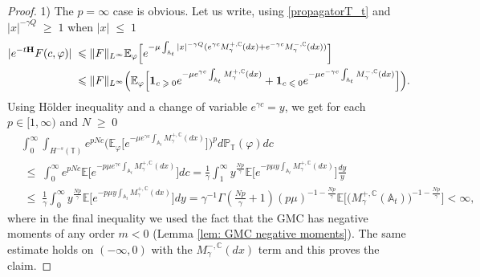 \documentclass[11pt]{amsart}
\numberwithin{equation}{section}
\theoremstyle{definition}
\renewcommand{\leq}{\;\leqslant\;}                   %
\renewcommand{\geq}{\;\geqslant\;}                   %
\newcommand{\C}{\mathbb{C}}
\newcommand{\A}{\mathbb{A}}
\def\P{\mathbb{P}}
\def\E{\mathbb{E}}
\def\T{\mathbb{T}}
\begin{document}
\begin{proof} 1) The $p=\infty$ case is obvious. Let us write, using \eqref{propagatorT_t} and $|x|^{-\gamma Q}\geq 1$ when $|x|\leq 1$
\[ \begin{split}
|e^{-t{\bf H}}F(c,\varphi)|\leq &  \|F\|_{L^\infty} \E_{\varphi}\Big[e^{-\mu\int_{\A_t}|x|^{-\gamma Q}(e^{\gamma c}M_\gamma^{+,\C}(dx)+e^{-\gamma c}M^{-,\C}_\gamma(dx))} \Big]\\
\leq &   \|F\|_{L^\infty} \Big(\E_{\varphi}\Big[{\bf 1}_{c\geq 0}e^{-\mu e^{\gamma c} \int_{\A_t}M_\gamma^{+,\C}(dx)}+{\bf 1}_{c\leq 0}e^{-\mu e^{-\gamma c} \int_{\A_t}M_\gamma^{-,\C}(dx)} \Big]\Big).
\end{split}\]
Using H\"older inequality and a change of variable $e^{\gamma c}=y$, we get  for each $p\in [1,\infty)$ and $N\geq 0$
\begin{align*}
 &\int_0^\infty \int_{H^{-s}(\T)}e^{pN c}\Big(\E_{\varphi}\Big[e^{-\mu e^{\gamma c} \int_{\A_t}M_\gamma^{+,\C}(dx)}\Big]\Big)^pd\P_\T(\varphi)dc\\
& \leq  \int_0^\infty e^{pN c} \E\Big[e^{-p\mu e^{\gamma c} \int_{\A_t}M_\gamma^{+,\C}(dx)}\Big]dc= \frac{1}{\gamma} \int_1^\infty y^{\frac{N p}{\gamma}} \E\Big[e^{-p\mu y \int_{\A_t}M_\gamma^{+,\C}(dx)}\Big]\frac{dy}{y}\\
& \leq \frac{1}{\gamma} \int_0^\infty y^{\frac{N p}{\gamma}}  \E\Big[e^{-p\mu y \int_{\A_t}M_\gamma^{+,\C}(dx)}\Big]dy=\gamma^{-1}\Gamma(\tfrac{N p}{\gamma}+1)(p\mu)^{-1-\frac{Np}{\gamma}}
\E\Big[ \Big(M_\gamma^{+,\C}(\A_t)\Big)^{-1-\frac{N p}{\gamma}}\Big]<\infty,
\end{align*}
where in the final inequality we used the fact that the GMC has negative moments of any order $m<0$ (Lemma \ref{lem: GMC negative moments}). The same estimate holds on $(-\infty,0)$ with the  $M_\gamma^{-,\C}(dx)$ term and this proves the claim.


\end{proof}
\end{document}
